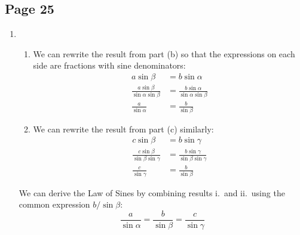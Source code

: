 \documentclass{article}
\newenvironment{solutions}[1]
{\subsection*{#1}
 \begin{enumerate}[leftmargin=1.5em]}
{\end{enumerate}}
\newenvironment{subsolutions}
{\begin{enumerate}}
{\end{enumerate}}
\newcommand{\subsolution}{\item}
\begin{document}
\begin{solutions}{Page 25}
\begin{subsolutions}
\subsolution
\begin{enumerate}
\item We can rewrite the result from part (b) so that the expressions on each side are fractions with sine denominators:
\begin{align*}
a\sin{\beta} &= b\sin{\alpha}\\
\frac{a\sin{\beta}}{\sin{\alpha}\sin{\beta}} &= \frac{b\sin{\alpha}}{\sin{\alpha}\sin{\beta}}\\
\frac{a}{\sin{\alpha}} &= \frac{b}{\sin{\beta}}
\end{align*}
\item We can rewrite the result from part (c) similarly:
\begin{align*}
c\sin{\beta} &= b\sin{\gamma}\\
\frac{c\sin{\beta}}{\sin{\beta}\sin{\gamma}} &= \frac{b\sin{\gamma}}{\sin{\beta}\sin{\gamma}}\\
\frac{c}{\sin{\gamma}} &= \frac{b}{\sin{\beta}}
\end{align*}
\end{enumerate}
We can derive the Law of Sines by combining results i.~and ii.~using the common expression $b/\sin{\beta}$:\\
\begin{equation*}
\frac{a}{\sin{\alpha}} = \frac{b}{\sin{\beta}} = \frac{c}{\sin{\gamma}}
\end{equation*}
\end{subsolutions}
\end{solutions}
\end{document}
